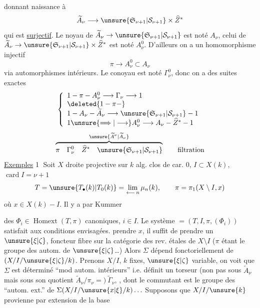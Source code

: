 donnant naissance à
\[\widetilde A_\nu\longrightarrow\unsure{\mathfrak S_{\nu+1}|\mathcal S_{\nu+1}}\times\widehat Z^*\]
qui est \uline{surjectif}. Le noyau de
$\widetilde A_\nu\to\unsure{\mathfrak S_{\nu+1}|\mathcal S_{\nu+1}}$
est noté $A_\nu$, celui de
$\widetilde A_\nu\to\unsure{\mathfrak S_{\nu+1}|\mathcal S_{\nu+1}}\times\widehat Z^*$
est noté $A_\nu^0$. D'ailleurs on a
un homomorphisme injectif
\[\pi\longrightarrow A_\nu^0\subset A_\nu\]
via automorphismes intérieurs. Le conoyau
est \deleted{$\unsure{\pi}$} noté $\Gamma_\nu^0$, donc on a des
suites exactes
\[\left\{\begin{array}{l}
1\mathbin{-}\pi\mathbin{-}A_\nu^0\longrightarrow\Gamma_\nu\longrightarrow1\\
\deleted{1\mathbin{-}\pi\mathbin{-}}\\
1\mathbin{-}A_\nu\mathbin{-}\widetilde A_\nu\longrightarrow\unsure{\mathfrak S_{\nu+1}|\mathcal S_{\nu+1}}\mathbin{-}1\\
1\unsure{\Longrightarrow|\longrightarrow}A_\nu^0\longrightarrow A_\nu\mathbin{-}\widehat Z^*\mathbin{-}1
\end{array}\right.\]
\[\overbrace{\pi\quad\Gamma_\nu^0\quad\widehat Z^*\quad\unsure{\mathfrak S_{\nu+1}|\mathcal S_{\nu+1}}}^{\unsure{\widetilde A^\nu|\widetilde A_\nu}}\qquad\text{filtration}\]
\uline{Exemples} \textcircled{1} Soit $X$ droite projective sur
$k$ alg. clos de car. $0$, $I\subset X(k)$, $\operatorname{card}I=\nu+1$
\[T=\unsure{T_\bullet(k)|T_0(k)}=\lim_{\longleftarrow\,n}\mu_n(k),\qquad\pi=\pi_1(X\setminus I,x)\]
où $x\in X(k)-I$. Il  y a par Kummer

des $\Phi_i\in\operatorname{Homext}(T,\pi)$ canoniques,
$i\in I$. Le système
$=(T,I,\pi,(\Phi_i))$
satisfait aux conditions envisagées. 
 
 prendre $x$, il suffit
de prendre un $\unsure{\xi|\zeta}$, foncteur fibre sur
la catégorie des rev. étales de $X\setminus I$
($\pi$ étant le groupe des autom. de $\unsure{\xi|\zeta}$\ldots)
Alors $\Sigma$ dépend fonctoriellement de
$(X/I/\unsure{\xi|\zeta}/k)$. Prenons $X/I$, $k$ fixes,
$\unsure{\xi|\zeta}$ variable, on voit que $\Sigma$ est déterminé
``mod autom. intérieurs'' i.e. 
définit un torseur  (non pas
sous $\widetilde A_\nu$ mais sous son quotient
$\widetilde A_\nu/\pi_\nu=)\ \widetilde\Gamma_\nu$,
,
dont le commutant est le groupe
des ``autom. ext.'' de 
$\Sigma(X/I/\unsure{x|\xi}/k)\ldots$
Supposons que $X/I/\unsure{k}$ provienne
par extension de la base

